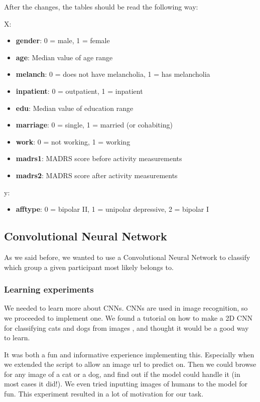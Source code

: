 \newpage
After the changes, the tables should be read the following way:

X:
\begin{itemize}
  \item \textbf{gender}: 0 = male, 1 = female
  \item \textbf{age}: Median value of age range
  \item \textbf{melanch}: 0 = does not have melancholia, 1 = has melancholia
  \item \textbf{inpatient}: 0 = outpatient, 1 = inpatient
  \item \textbf{edu}: Median value of education range
  \item \textbf{marriage}: 0 = single, 1 = married (or cohabiting)
  \item \textbf{work}: 0 = not working, 1 = working
  \item \textbf{madrs1}: MADRS score before activity measurements
  \item \textbf{madrs2}: MADRS score after activity measurements
\end{itemize}

y:
\begin{itemize}
  \item \textbf{afftype}: 0 = bipolar II, 1 = unipolar depressive, 2 = bipolar I
\end{itemize}

\subsection{Convolutional Neural Network}

As we said before, we wanted to use a Convolutional Neural Network to classify which group a given participant most likely belongs to.

\subsubsection{Learning experiments}

We needed to learn more about CNNs. CNNs are used in image recognition, so we proceeded to implement one. We found a tutorial on how to make 
a 2D CNN for classifying cats and dogs from images \cite{2d_cnn}, and thought it would be a good way to learn.

It was both a fun and informative experience implementing this. Especially when we extended the script to allow an image url to predict on. 
Then we could browse for any image of a cat or a dog, and find out if the model could handle it (in most cases it did!). 
We even tried inputting images of humans to the model for fun. This experiment resulted in a lot of motivation for our task.

